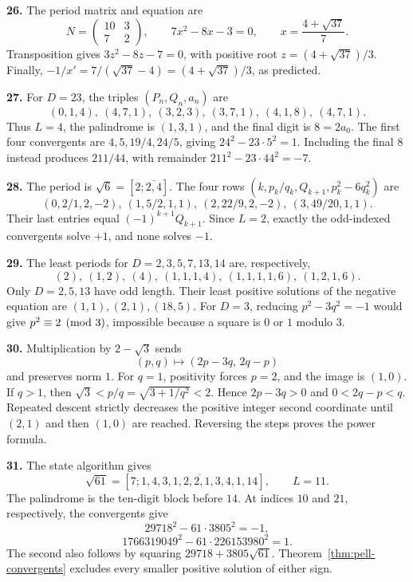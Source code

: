 \textbf{26.} The period matrix and equation are
\[
 N=\begin{pmatrix}10&3\\7&2\end{pmatrix},
 \qquad 7x^2-8x-3=0,\qquad x=\frac{4+\sqrt{37}}7.
\]
Transposition gives $3z^2-8z-7=0$, with positive root
$z=(4+\sqrt{37})/3$. Finally,
$-1/x'=7/(\sqrt{37}-4)=(4+\sqrt{37})/3$, as predicted.

\textbf{27.} For $D=23$, the triples $(P_n,Q_n,a_n)$ are
\[
 (0,1,4),\ (4,7,1),\ (3,2,3),\ (3,7,1),\ (4,1,8),\ (4,7,1).
\]
Thus $L=4$, the palindrome is $(1,3,1)$, and the final digit is
$8=2a_0$. The first four convergents are $4,5,19/4,24/5$, giving
$24^2-23\cdot5^2=1$. Including the final $8$ instead produces
$211/44$, with remainder $211^2-23\cdot44^2=-7$.

\textbf{28.} The period is $\sqrt6=[2;\overline{2,4}]$.
The four rows $(k,p_k/q_k,Q_{k+1},p_k^2-6q_k^2)$ are
\[
 (0,2/1,2,-2),\ (1,5/2,1,1),\
 (2,22/9,2,-2),\ (3,49/20,1,1).
\]
Their last entries equal $(-1)^{k+1}Q_{k+1}$. Since $L=2$, exactly
the odd-indexed convergents solve $+1$, and none solves $-1$.

\textbf{29.} The least periods for $D=2,3,5,7,13,14$ are, respectively,
\[
 (2),\ (1,2),\ (4),\ (1,1,1,4),\ (1,1,1,1,6),\ (1,2,1,6).
\]
Only $D=2,5,13$ have odd length. Their least positive solutions of
the negative equation are $(1,1),(2,1),(18,5)$.
For $D=3$, reducing $p^2-3q^2=-1$ would give
$p^2\equiv2\pmod3$, impossible because a square is $0$ or $1$ modulo $3$.

\textbf{30.} Multiplication by $2-\sqrt3$ sends
\[
 (p,q)\longmapsto(2p-3q,\,2q-p)
\]
and preserves norm $1$. For $q=1$, positivity forces $p=2$, and
the image is $(1,0)$. If $q>1$, then
$\sqrt3<p/q=\sqrt{3+1/q^2}<2$. Hence $2p-3q>0$ and
$0<2q-p<q$. Repeated descent strictly decreases the positive integer
second coordinate until $(2,1)$ and then $(1,0)$ are reached.
Reversing the steps proves the power formula.

\textbf{31.} The state algorithm gives
\[
 \sqrt{61}=[7;\overline{1,4,3,1,2,2,1,3,4,1,14}],\qquad L=11.
\]
The palindrome is the ten-digit block before $14$.
At indices $10$ and $21$, respectively, the convergents give
\[
 29718^2-61\cdot3805^2=-1,
\]
\[
 1766319049^2-61\cdot226153980^2=1.
\]
The second also follows by squaring $29718+3805\sqrt{61}$.
Theorem~\ref{thm:pell-convergents} excludes every smaller positive
solution of either sign.

